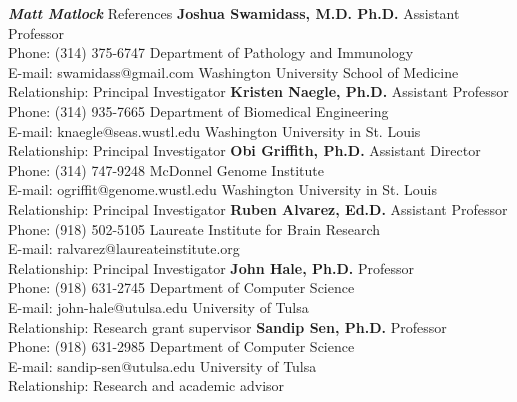 \documentclass[10pt]{article}
\begin{document}
\begin{cv}{\huge \it \bfseries Matt Matlock}
\setlength{\parindent}{0cm}
{\cvlistheadingfont References}
\newline \newline
{\bf Joshua Swamidass, M.D. Ph.D.} \hfill Assistant Professor \\ Phone: (314) 375-6747 \hfill Department of Pathology and Immunology \\ E-mail: swamidass@gmail.com \hfill Washington University School of Medicine \\ Relationship: Principal Investigator
\newline \newline
{\bf Kristen Naegle, Ph.D.} \hfill Assistant Professor  \\ Phone: (314) 935-7665 \hfill Department of Biomedical Engineering \\ E-mail: knaegle@seas.wustl.edu \hfill Washington University in St. Louis \\ Relationship: Principal Investigator
\newline \newline
{\bf Obi Griffith, Ph.D.} \hfill Assistant Director \\ Phone: (314) 747-9248 \hfill McDonnel Genome Institute \\ E-mail: ogriffit@genome.wustl.edu \hfill Washington University in St. Louis \\ Relationship: Principal Investigator
\newline \newline
{\bf Ruben Alvarez, Ed.D.} \hfill Assistant Professor \\ Phone: (918) 502-5105 \hfill Laureate Institute for Brain Research \\ E-mail: ralvarez@laureateinstitute.org \\ Relationship: Principal Investigator
\newline \newline
{\bf John Hale, Ph.D.} \hfill Professor \\ Phone: (918) 631-2745 \hfill Department of Computer Science \\ E-mail: john-hale@utulsa.edu \hfill University of Tulsa \\ Relationship: Research grant supervisor
\newline \newline
{\bf Sandip Sen, Ph.D.} \hfill Professor \\ Phone: (918) 631-2985 \hfill Department of Computer Science \\ E-mail: sandip-sen@utulsa.edu \hfill University of Tulsa \\ Relationship: Research and academic advisor
\newline \newline

\end{cv}
\end{document}
